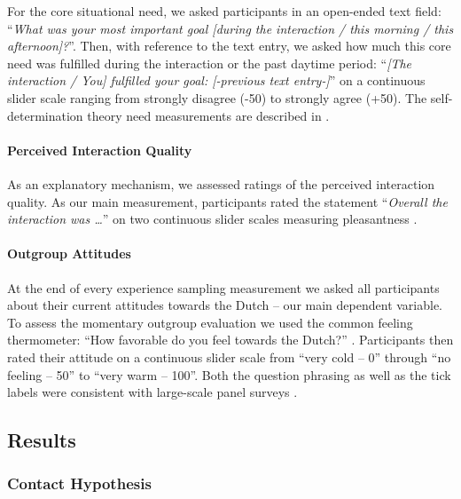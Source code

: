 For the core situational need, we asked participants in an open-ended
text field:
``\textit{What was your most important goal [during the interaction / this morning / this afternoon]?}''.
Then, with reference to the text entry, we asked how much this core need
was fulfilled during the interaction or the past daytime period:
``\textit{[The interaction / You] fulfilled your goal: [-previous text entry-]}''
on a continuous slider scale ranging from strongly disagree (-50) to
strongly agree (+50). The self-determination theory need measurements
are described in .

\paragraph{Perceived Interaction Quality}

As an explanatory mechanism, we assessed ratings of the perceived
interaction quality. As our main measurement, participants rated the
statement ``\textit{Overall the interaction was …}'' on two continuous
slider scales measuring pleasantness
\citep[from unpleasant (-50) to pleasant (+50)) and meaningfulness (from superficial (-50) to meaningful (+50); both items adapted from][]{Downie2008}.

\paragraph{Outgroup Attitudes}

At the end of every experience sampling measurement we asked all
participants about their current attitudes towards the Dutch -- our main
dependent variable. To assess the momentary outgroup evaluation we used
the common feeling thermometer: ``How favorable do you feel towards the
Dutch?'' \citep[][]{Lavrakas2008}. Participants then rated their
attitude on a continuous slider scale from ``very cold -- 0'' through
``no feeling -- 50'' to ``very warm -- 100''. Both the question phrasing
as well as the tick labels were consistent with large-scale panel
surveys \citep[e.g.,][]{DeBell2010}.

\subsection{Results}

\subsubsection{Contact Hypothesis}

